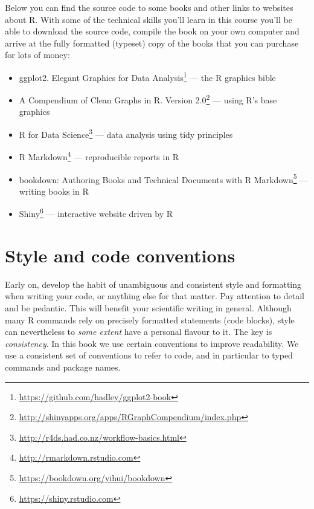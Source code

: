 \documentclass[english,10pt,a4paper,oneside]{book}
\renewcommand{\href}[2]{#2\footnote{\url{#1}}}
\let\rmarkdownfootnote\footnote%
\def\footnote{\protect\rmarkdownfootnote}
\providecommand{\tightlist}{%
  \setlength{\itemsep}{0pt}\setlength{\parskip}{0pt}}
\theoremstyle{definition}
\theoremstyle{definition}
\theoremstyle{definition}
\theoremstyle{remark}
\begin{document}
Below you can find the source code to some books and other links to
websites about R. With some of the technical skills you'll learn in this
course you'll be able to download the source code, compile the book on
your own computer and arrive at the fully formatted (typeset) copy of
the books that you can purchase for lots of money:

\begin{itemize}
\tightlist
\item
  \href{https://github.com/hadley/ggplot2-book}{ggplot2. Elegant
  Graphics for Data Analysis} --- the R graphics bible
\item
  \href{http://shinyapps.org/apps/RGraphCompendium/index.php}{A
  Compendium of Clean Graphs in R. Version 2.0} --- using R's base
  graphics
\item
  \href{http://r4ds.had.co.nz/workflow-basics.html}{R for Data Science}
  --- data analysis using tidy principles
\item
  \href{http://rmarkdown.rstudio.com}{R Markdown} --- reproducible
  reports in R
\item
  \href{https://bookdown.org/yihui/bookdown}{bookdown: Authoring Books
  and Technical Documents with R Markdown} --- writing books in R
\item
  \href{https://shiny.rstudio.com}{Shiny} --- interactive website driven
  by R
\end{itemize}

\section*{Style and code conventions}\label{style-and-code-conventions}

Early on, develop the habit of unambiguous and consistent style and
formatting when writing your code, or anything else for that matter. Pay
attention to detail and be pedantic. This will benefit your scientific
writing in general. Although many R commands rely on precisely formatted
statements (code blocks), style can nevertheless to \emph{some extent}
have a personal flavour to it. The key is \emph{consistency}. In this
book we use certain conventions to improve readability. We use a
consistent set of conventions to refer to code, and in particular to
typed commands and package names.
\end{document}
